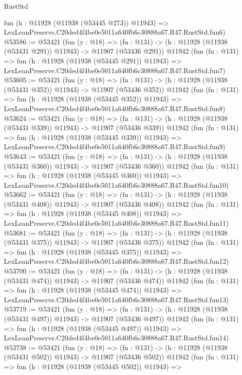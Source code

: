 \begin{lexlean}{RustStd}
\begin{coremodule}
    fun (h : @11928 (@11938 (@53445 @273)) @11943) =>
    LexLeanPreserve.C20ded4f4be0e5011a640fb6c30888a67.R47.RustStd.fun6)
@53586 := @53421
    (fun (y : @18) =>
    (fn : @131) -> (h : @11928 (@11938 (@53431 @291)) @11943) -> @11907 (@53436 @291))
    @11942
    (fun (fn : @131) =>
    fun (h : @11928 (@11938 (@53445 @291)) @11943) =>
    LexLeanPreserve.C20ded4f4be0e5011a640fb6c30888a67.R47.RustStd.fun7)
@53605 := @53421
    (fun (y : @18) =>
    (fn : @131) -> (h : @11928 (@11938 (@53431 @352)) @11943) -> @11907 (@53436 @352))
    @11942
    (fun (fn : @131) =>
    fun (h : @11928 (@11938 (@53445 @352)) @11943) =>
    LexLeanPreserve.C20ded4f4be0e5011a640fb6c30888a67.R47.RustStd.fun8)
@53624 := @53421
    (fun (y : @18) =>
    (fn : @131) -> (h : @11928 (@11938 (@53431 @339)) @11943) -> @11907 (@53436 @339))
    @11942
    (fun (fn : @131) =>
    fun (h : @11928 (@11938 (@53445 @339)) @11943) =>
    LexLeanPreserve.C20ded4f4be0e5011a640fb6c30888a67.R47.RustStd.fun9)
@53643 := @53421
    (fun (y : @18) =>
    (fn : @131) -> (h : @11928 (@11938 (@53431 @360)) @11943) -> @11907 (@53436 @360))
    @11942
    (fun (fn : @131) =>
    fun (h : @11928 (@11938 (@53445 @360)) @11943) =>
    LexLeanPreserve.C20ded4f4be0e5011a640fb6c30888a67.R47.RustStd.fun10)
@53662 := @53421
    (fun (y : @18) =>
    (fn : @131) -> (h : @11928 (@11938 (@53431 @408)) @11943) -> @11907 (@53436 @408))
    @11942
    (fun (fn : @131) =>
    fun (h : @11928 (@11938 (@53445 @408)) @11943) =>
    LexLeanPreserve.C20ded4f4be0e5011a640fb6c30888a67.R47.RustStd.fun11)
@53681 := @53421
    (fun (y : @18) =>
    (fn : @131) -> (h : @11928 (@11938 (@53431 @375)) @11943) -> @11907 (@53436 @375))
    @11942
    (fun (fn : @131) =>
    fun (h : @11928 (@11938 (@53445 @375)) @11943) =>
    LexLeanPreserve.C20ded4f4be0e5011a640fb6c30888a67.R47.RustStd.fun12)
@53700 := @53421
    (fun (y : @18) =>
    (fn : @131) -> (h : @11928 (@11938 (@53431 @474)) @11943) -> @11907 (@53436 @474))
    @11942
    (fun (fn : @131) =>
    fun (h : @11928 (@11938 (@53445 @474)) @11943) =>
    LexLeanPreserve.C20ded4f4be0e5011a640fb6c30888a67.R47.RustStd.fun13)
@53719 := @53421
    (fun (y : @18) =>
    (fn : @131) -> (h : @11928 (@11938 (@53431 @497)) @11943) -> @11907 (@53436 @497))
    @11942
    (fun (fn : @131) =>
    fun (h : @11928 (@11938 (@53445 @497)) @11943) =>
    LexLeanPreserve.C20ded4f4be0e5011a640fb6c30888a67.R47.RustStd.fun14)
@53738 := @53421
    (fun (y : @18) =>
    (fn : @131) -> (h : @11928 (@11938 (@53431 @502)) @11943) -> @11907 (@53436 @502))
    @11942
    (fun (fn : @131) =>
    fun (h : @11928 (@11938 (@53445 @502)) @11943) =>

\end{coremodule}
\end{lexlean}
